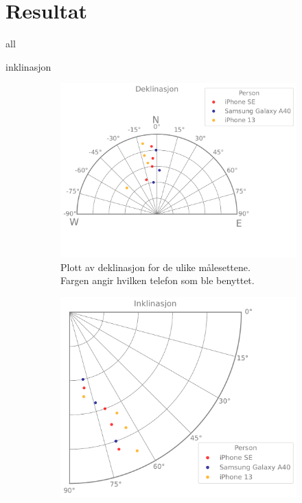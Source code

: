 \section{Resultat}

{all}


{inklinasjon}

\begin{figure}[h!]
    \centering
\begin{subfigure}{.5\textwidth}
    \includegraphics[width=1\textwidth]{Plots/declination.pdf}
    \caption{Plott av deklinasjon for de ulike målesettene. \\
    Fargen angir hvilken telefon som ble benyttet.}
    \label{fig:plot_declination}
\end{subfigure}%
\begin{subfigure}{.5\textwidth}
    \includegraphics[width=1\textwidth]{Plots/inclination.pdf}

\end{subfigure}
\end{figure}
